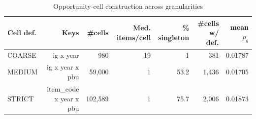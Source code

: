 \begin{table}[htbp]\centering
\caption{Opportunity-cell construction across granularities}
\label{tab:opp_cell_construction}
\begin{tabular}{lrrrrrr}\hline
Cell def. & Keys & \#cells & Med. items/cell & \% singleton & \#cells w/ def. & mean $p_g$ \\\hline
COARSE & ig x year &     980 & 19 & 1 &   381 & 0.01787 \\
MEDIUM & ig x year x pbu &  59,000 & 1 & 53.2 & 1,436 & 0.01705 \\
STRICT & item\_code x year x pbu & 102,589 & 1 & 75.7 & 2,006 & 0.01873 \\
\hline\end{tabular}\end{table}
